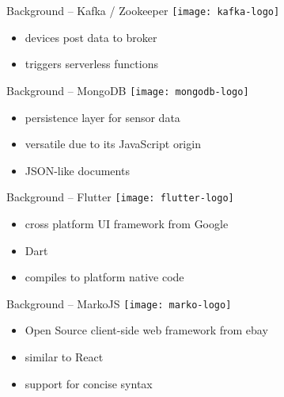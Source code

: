 \documentclass[aspectratio=1610]{beamer}
\begin{document}
  \begin{frame}{Background -- Kafka / Zookeeper}
    \texttt{[image: kafka-logo]}

    \vspace*{1.5em}

    \begin{itemize}
      \item devices post data to broker
      \item triggers serverless functions
    \end{itemize}
  \end{frame}

  \begin{frame}{Background -- MongoDB}
    \texttt{[image: mongodb-logo]}

    \vspace*{1.5em}

    \begin{itemize}
      \item persistence layer for sensor data
      \item versatile due to its JavaScript origin
      \item JSON-like documents
    \end{itemize}
  \end{frame}

  \begin{frame}{Background -- Flutter}
    \texttt{[image: flutter-logo]}

    \vspace*{2em}

    \begin{itemize}
      \item cross platform UI framework from Google
      \item Dart
      \item compiles to platform native code
    \end{itemize}
  \end{frame}

  \begin{frame}{Background -- MarkoJS}
    \texttt{[image: marko-logo]}

    \vspace*{2em}

    \begin{itemize}
      \item Open Source client-side web framework from ebay
      \item similar to React
      \item support for concise syntax
    \end{itemize}
  \end{frame}
\end{document}
